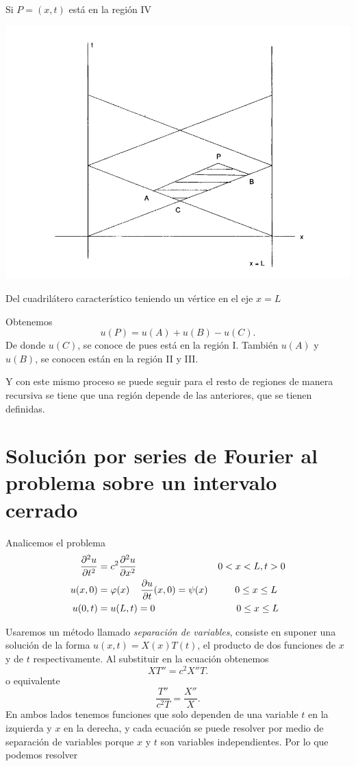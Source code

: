 \documentclass[11pt]{book}
\theoremstyle{plain}
\theoremstyle{definition}
\begin{document}
Si $P = (x,t)$ está en la región IV
\begin{center}
    \includegraphics[scale=0.2]{RegionIV.png}
\end{center}
Del cuadrilátero característico teniendo un vértice en el eje $x=L$

Obtenemos 
\[
u(P) = u(A) + u(B) - u(C)
.\]
De donde $u(C)$, se conoce de pues está en la región I. 
También $u(A)$ y $u(B)$, se conocen están en la región II y III.

Y con este mismo proceso se puede seguir para el resto de regiones de manera recursiva se tiene que una región depende de las anteriores, que se tienen definidas.

\section{Solución por series de Fourier al problema sobre un intervalo cerrado}
Analicemos el problema
\setcounter{equation}{0}
\begin{align}
    \frac{\partial^2 u}{\partial t^2} &= c^2 \frac{\partial^2 u}{\partial x^2} \hspace{30mm} 0<x<L, t > 0\\ 
    u(x,0)&= \varphi(x) \hspace{4mm} \frac{\partial u}{\partial t}(x,0) = \psi(x)  \hspace{10mm} 0\leq x\leq L\\
    u(0,t)&= u(L,t) = 0  \hspace{30mm} 0\leq x\leq L
\end{align}

Usaremos un método llamado \emph{separación de variables}, consiste en suponer una solución de la forma $u(x,t) = X(x)T(t)$, el producto de dos funciones de $x$ y de $t$ respectivamente. Al substituir en la ecuación obtenemos
\[
XT'' = c^{2}X''T
.\]
o equivalente
\[
\frac{T''}{c^{2}T} = \frac{X''}{X}
.\]
En ambos lados tenemos funciones que solo dependen de una variable $t$ en la izquierda y $x$ en la derecha, y cada ecuación se puede resolver por medio de separación de variables porque $x$ y $t$ son variables independientes.
Por lo que podemos resolver
\end{document}

